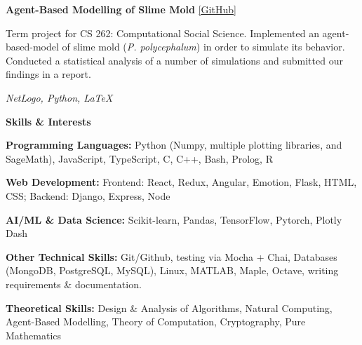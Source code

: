 \documentclass[12pt, a4paper]{article}
\begin{document}
\textbf{Agent-Based Modelling of Slime Mold} \hfill {\href{https://github.com/hurryingauto3/CS262-Computational-Social-Science}{[GitHub]}}
\begin{center}
    \parbox{0.9\linewidth}{
        Term project for CS 262: Computational Social Science. Implemented an agent-based-model of slime mold (\textit{P. polycephalum}) in order to simulate its behavior. Conducted a statistical analysis of a number of simulations and submitted our findings in a report. 
    
    \textit{NetLogo, Python, \LaTeX}
    }
\end{center}

\begin{center}
    \large\textbf{Skills \& Interests}
\end{center}

\textbf{Programming Languages:} Python (Numpy, multiple plotting libraries, and SageMath), JavaScript, TypeScript, C, C++, Bash, Prolog, R

\textbf{Web Development:} Frontend: React, Redux, Angular, Emotion, Flask, HTML, CSS; Backend: Django, Express, Node

\textbf{AI/ML \& Data Science:} Scikit-learn, Pandas, TensorFlow, Pytorch, Plotly Dash 

\textbf{Other Technical Skills:} Git/Github, testing via Mocha + Chai, Databases (MongoDB, PostgreSQL, MySQL), Linux, MATLAB, Maple, Octave, writing requirements \& documentation.

\textbf{Theoretical Skills:} Design \& Analysis of Algorithms, Natural Computing, Agent-Based Modelling, Theory of Computation, Cryptography, Pure Mathematics
\end{document}
